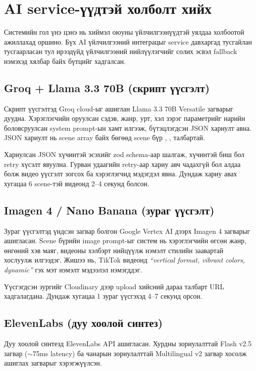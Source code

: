 \section{AI service-үүдтэй холболт хийх}

Системийн гол үнэ цэнэ нь хиймэл оюуны үйлчилгээнүүдтэй уялдаа холбоотой ажиллахад оршино. Бүх AI үйлчилгээний интеграцыг service давхаргад тусгайлан тусгаарласан тул ирээдүйд үйлчилгээний нийлүүлэгчийг солих эсвэл fallback нэмэхэд хялбар байх бүтцийг хадгалсан.

\subsection{Groq + Llama 3.3 70B (скрипт үүсгэлт)}

Скрипт үүсгэлтэд Groq cloud-ыг ашиглан Llama 3.3 70B Versatile загварыг дуудна. Хэрэглэгчийн оруулсан сэдэв, жанр, урт, хэл зэрэг параметрийг нарийн боловсруулсан system prompt-ын хамт илгээж, бүтэцлэгдсэн JSON хариулт авна. JSON хариулт нь scene array байх бөгөөд scene бүр , ,  талбартай.

Хариулсан JSON хүчинтэй эсэхийг zod schema-аар шалгаж, хүчинтэй биш бол retry хүсэлт явуулна. Гурван удаагийн retry-аар хариу авч чадахгүй бол алдаа болж видео үүсгэлт зогсох ба хэрэглэгчид мэдэгдэл явна. Дундаж хариу авах хугацаа 6 scene-тэй видеонд 2--4 секунд болсон.

\subsection{Imagen 4 / Nano Banana (зураг үүсгэлт)}

Зураг үүсгэлтэд үндсэн загвар болгон Google Vertex AI дээрх Imagen 4 загварыг ашигласан. Scene бүрийн image prompt-ыг систем нь хэрэглэгчийн өгсөн жанр, өнгөний хэв маяг, видеоны хэлбэрт нийцүүлж нэмэлт стилийн заавартай хослуулж илгээдэг. Жишээ нь, TikTok видеонд \textit{``vertical format, vibrant colors, dynamic''} гэх мэт нэмэлт мэдээлэл нэмэгддэг.

Үүсгэгдсэн зургийг Cloudinary дээр upload хийсний дараа  талбарт URL хадгалагдана. Дундаж хугацаа 1 зураг үүсгэхэд 4--7 секунд орсон.

\subsection{ElevenLabs (дуу хоолой синтез)}

Дуу хоолой синтезд ElevenLabs API ашигласан. Хурдны зориулалттай Flash v2.5 загвар ($\sim$75ms latency) ба чанарын зориулалттай Multilingual v2 загвар хосолж ашиглах загварыг хэрэгжүүлсэн.

